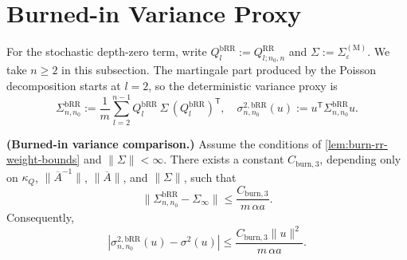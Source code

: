 
\section{Burned-in Variance Proxy}

For the stochastic depth-zero term, write
$Q_{l}^{\mathrm{bRR}} := Q_{l; n_{0}, n}^{\mathrm{RR}}$ and
$\Sigma := \Sigma_{\varepsilon}^{(\mathrm{M})}$. We take $n \ge 2$ in this subsection.
The martingale part produced by the Poisson decomposition starts at $l = 2$, so
the deterministic variance proxy is
\begin{equation}
\Sigma_{n,n_{0}}^{\mathrm{bRR}}
  := \frac{1}{m} \sum_{l = 2}^{n - 1}
      Q_{l}^{\mathrm{bRR}} \, \Sigma \, (Q_{l}^{\mathrm{bRR}})^{\mathsf{T}},
\quad
\sigma_{n,n_{0}}^{2, \mathrm{bRR}}(u)
  := u^{\mathsf{T}} \Sigma_{n,n_{0}}^{\mathrm{bRR}} u.
\label{eq:burn-variance-proxy}
\end{equation}

\begin{lemma}\label{lem:burn-variance-comparison}
  \textbf{(Burned-in variance comparison.)}
  Assume the conditions of \cref{lem:burn-rr-weight-bounds} and $\lVert \Sigma \rVert < \infty$.
  There exists a constant $C_{\mathrm{burn,3}}$, depending only on
  $\kappa_{Q}$, $\lVert \overline{A}^{-1} \rVert$, $\lVert \overline{A} \rVert$, and $\lVert \Sigma \rVert$,
  such that
  \begin{equation}
\lVert \Sigma_{n,n_{0}}^{\mathrm{bRR}} - \Sigma_{\infty} \rVert
    \le \frac{C_{\mathrm{burn,3}}}{m \, \alpha a}.
\label{eq:burn-variance-comparison}
\end{equation}
  Consequently,
  \begin{equation}
| \sigma_{n,n_{0}}^{2, \mathrm{bRR}}(u) - \sigma^{2}(u) |
    \le \frac{C_{\mathrm{burn,3}} \lVert u \rVert^{2}}{m \, \alpha a}.
\label{eq:burn-scalar-variance-comparison}
\end{equation}
\end{lemma}

